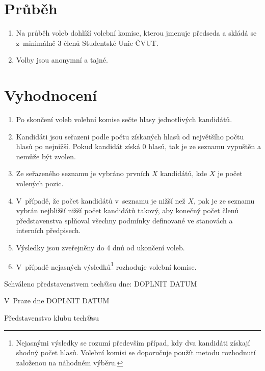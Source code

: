 \documentclass[10pt]{article}
\def \Datum {DOPLNIT DATUM} %
\begin{document}
\section{Průběh}
	\begin{enumerate}
		\item Na průběh voleb dohlíží volební komise, kterou jmenuje předseda a skládá se z~minimálně 3 členů Studentské Unie ČVUT.
		\item Volby jsou anonymní a tajné.
	\end{enumerate}

\section{Vyhodnocení}
	\begin{enumerate}
		\item Po skončení voleb volební komise sečte hlasy jednotlivých kandidátů.
		\item Kandidáti jsou seřazeni podle počtu získaných hlasů od největšího počtu hlasů po nejnižší. Pokud kandidát získá 0 hlasů, tak je ze seznamu vypuštěn a nemůže být zvolen.
		\item Ze seřazeného seznamu je vybráno prvních $X$ kandidátů, kde $X$ je počet volených pozic.
		\item V~případě, že počet kandidátů v~seznamu je nižší než $X$, pak je ze seznamu vybrán nejbližší nižší počet kandidátů takový, aby konečný počet členů představenstva splňoval všechny podmínky definované ve stanovách a interních předpisech.
		\item Výsledky jsou zveřejněny do 4 dnů od ukončení voleb.
		\item V~případě nejasných výsledků\footnote{Nejasnými výsledky se rozumí především případ, kdy dva kandidáti získají shodný počet hlasů. Volební komisi se doporučuje použít metodu rozhodnutí založenou na náhodném výběru.} rozhoduje volební komise.
	\end{enumerate}

\vspace{10mm}

Schváleno představenstvem tech@su dne: \Datum

\vspace{30mm}

\hfill V~Praze dne \Datum

\hfill Představenstvo klubu tech@su
\end{document}
